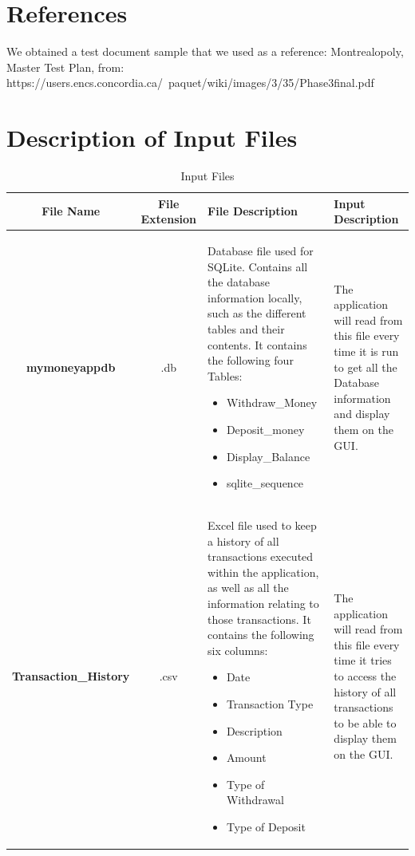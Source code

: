 \documentclass[12pt]{article}
\begin{document}
\section{References}
We obtained a test document sample that we used as a reference: Montrealopoly, Master Test Plan, from: https://users.encs.concordia.ca/~paquet/wiki/images/3/35/Phase3final.pdf

\appendix

\section{Description of Input Files}


\begin{table}[H]
\caption{Input Files}
\begin{center}
\begin{tabular}{|c|c|p{4.5cm}|p{4cm}|}
\hline
  \bf File Name & \bf File Extension & \bf File Description & \bf Input Description \\\hline
	\bf mymoneyappdb &
		.db &
		Database file used for SQLite. Contains all the database information locally, such as the different tables and their contents. It contains the following four Tables: 
\begin{itemize} 
	\item Withdraw\_Money
	\item Deposit\_money
	\item Display\_Balance
	\item sqlite\_sequence
\end{itemize}
		& The application will read from this file every time it is run to get all the Database information and display them on the GUI. \\
		\hline
		\bf Transaction\_History	&
		.csv 	&
		Excel file used to keep a history of all transactions executed within the application, as well as all the information relating to those transactions. It contains the following six columns:
		\begin{itemize} 
		\item Date
		\item Transaction Type
		\item Description
		\item Amount
		\item Type of Withdrawal
		\item Type of Deposit
		\end{itemize}
	& The application will read from this file every time it tries to access the history of all transactions to be able to display them on the GUI.\\\hline
\end{tabular}
\end{center}
\end{table}
\end{document}
